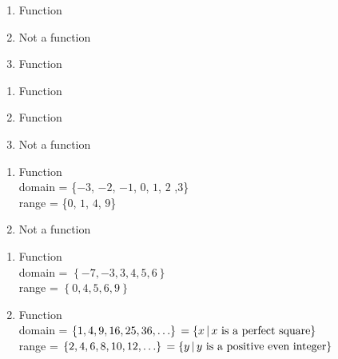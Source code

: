 \documentclass{ximera}
\begin{document}
\begin{enumerate}

\item   Function
\item   Not a function
\item Function

\end{enumerate}


\begin{enumerate}

\item Function
\item  Function
\item Not a function

\end{enumerate}


\begin{enumerate}

\item Function \\ domain = \{$-3$, $-2$, $-1$, $0$, $1$, $2$ ,$3$\} \\ range = \{$0$, $1$, $4$, $9$\}

 

 

\item Not a function

\end{enumerate}


\begin{enumerate}

\item  Function \\ domain = $\left\{ -7, -3, 3, 4, 5, 6 \right\}$ \\ range = $\left\{ 0,4,5,6,9 \right\}$


 

 

\item  Function \\ domain =   $\left\{ 1, 4, 9, 16, 25, 36, \ldots \right\} \\ = \left\{ x \, | \, \text{$x$ is a perfect square} \right\}$ \\ range =  $\left\{ 2, 4, 6, 8, 10, 12, \ldots \right\} \\ = \left\{ y \, | \, \text{$y$ is a positive even integer} \right\}$

\end{enumerate}
\end{document}

